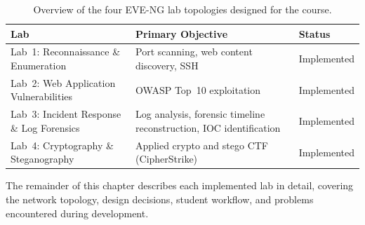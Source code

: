 \begin{table}[htbp]
\centering
\small
\setlength{\tabcolsep}{5pt}
\begin{tabularx}{\textwidth}{@{}lXl@{}}
\toprule
\textbf{Lab} & \textbf{Primary Objective} & \textbf{Status} \\
\midrule
Lab~1: Reconnaissance \& Enumeration & Port scanning, web content discovery, SSH & Implemented \\
Lab~2: Web Application Vulnerabilities & OWASP Top~10 exploitation & Implemented \\
Lab~3: Incident Response \& Log Forensics & Log analysis, forensic timeline reconstruction, IOC identification & Implemented \\
Lab~4: Cryptography \& Steganography & Applied crypto and stego CTF (CipherStrike) & Implemented \\
\bottomrule
\end{tabularx}
\caption{Overview of the four EVE-NG lab topologies designed for the course.}
\label{tab:lab-overview}
\end{table}

The remainder of this chapter describes each implemented lab in detail, covering
the network topology, design decisions, student workflow, and problems encountered
during development.










